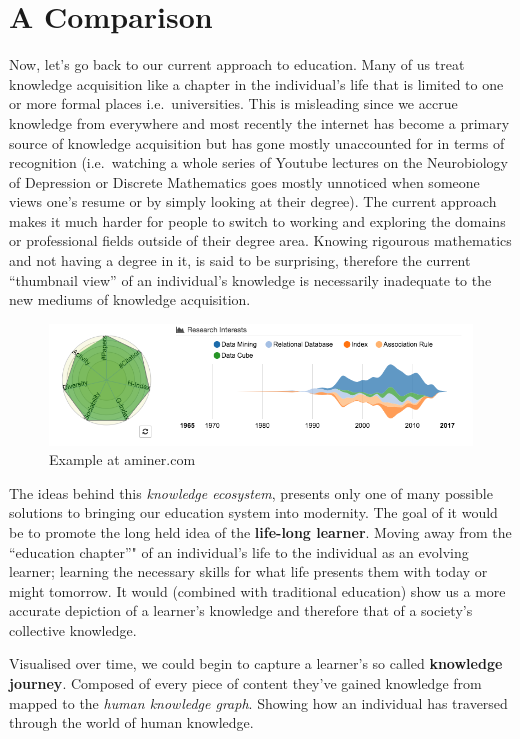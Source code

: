 \documentclass[]{book}
\theoremstyle{definition}
\theoremstyle{definition}
\theoremstyle{definition}
\theoremstyle{remark}
\begin{document}
\section{A Comparison}\label{a-comparison}

Now, let's go back to our current approach to education. Many of us
treat knowledge acquisition like a chapter in the individual's life that
is limited to one or more formal places i.e.~universities. This is
misleading since we accrue knowledge from everywhere and most recently
the internet has become a primary source of knowledge acquisition but
has gone mostly unaccounted for in terms of recognition (i.e.~watching a
whole series of Youtube lectures on the Neurobiology of Depression or
Discrete Mathematics goes mostly unnoticed when someone views one's
resume or by simply looking at their degree). The current approach makes
it much harder for people to switch to working and exploring the domains
or professional fields outside of their degree area. Knowing rigourous
mathematics and not having a degree in it, is said to be surprising,
therefore the current ``thumbnail view'' of an individual's knowledge is
necessarily inadequate to the new mediums of knowledge acquisition.

\begin{figure}
\centering
\includegraphics{img/aminer.png}
\caption{Example at aminer.com}
\end{figure}

The ideas behind this \emph{knowledge ecosystem}, presents only one of
many possible solutions to bringing our education system into modernity.
The goal of it would be to promote the long held idea of the
\textbf{life-long learner}. Moving away from the ``education chapter''"
of an individual's life to the individual as an evolving learner;
learning the necessary skills for what life presents them with today or
might tomorrow. It would (combined with traditional education) show us a
more accurate depiction of a learner's knowledge and therefore that of a
society's collective knowledge.

Visualised over time, we could begin to capture a learner's so called
\textbf{knowledge journey}. Composed of every piece of content they've
gained knowledge from mapped to the \emph{human knowledge graph}.
Showing how an individual has traversed through the world of human
knowledge.
\end{document}
